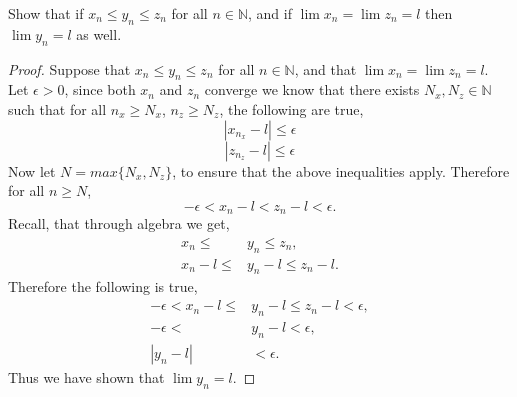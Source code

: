 \documentclass[12pt]{article}
\makeatletter
\theoremstyle{homework}
\newenvironment{exercise}[1]
{\def\@currentlabel{#1}\exercisecore}
{\endexercisecore}
\newcommand{\Nats}{\ensuremath{\mathbb N}}
\makeatother
\begin{document}
\begin{exercise}{2.3.3} Show that if $x_n \le y_n \le z_n$ for all $n \in \Nats$, 
  and if $\lim x_n = \lim z_n = l$ then $\lim y_n = l$ as well. \\

  \begin{proof}
    Suppose that $x_n \le y_n \le z_n$ for all $n \in \Nats$, and that $\lim x_n = \lim z_n = l$. Let $\epsilon > 0$,
    since both $x_n$ and $z_n$ converge we know that there exists $N_x, N_z \in \Nats$ such that for all $n_x \geq N_x$, $n_z \geq N_z$, the following are true,
    \begin{equation*}
      |x_{n_x} - l| \le \epsilon 
    \end{equation*}   
    \begin{equation*}
      |z_{n_z} - l| \le \epsilon 
    \end{equation*}
    Now let $N = max\{N_x, N_z\}$, to ensure that the above inequalities apply. Therefore for all $n \geq N$,
    \begin{equation*}
      -\epsilon < x_n - l <z_n - l <\epsilon.
    \end{equation*}   
    Recall, that through algebra we get,
    \begin{align*}
      x_n \le &y_n \le z_n,\\
      x_n - l \le &y_n - l \le z_n - l.
    \end{align*}
    Therefore the following is true,
    \begin{align*}
       -\epsilon < x_n - l \le &y_n - l \le z_n - l <\epsilon,\\
        -\epsilon < &y_n - l < \epsilon,\\
        |y_n - l| &< \epsilon.
    \end{align*}
 Thus we have shown that $\lim y_n = l$.
  \end{proof}
\end{exercise}
\vspace{.5in}
\end{document}
